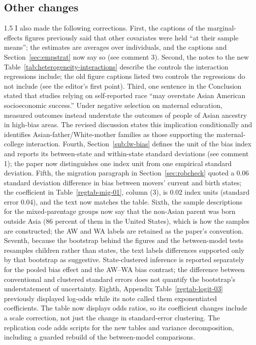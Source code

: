 \documentclass[12pt,english]{article}
\newcommand{\rrxspc}{1.5}
\begin{document}
\begin{refsection}
    \subsection*{Other changes}
    \begin{spacing}{\rrxspc}
        I also made the following corrections. First, the captions of the marginal-effects figures previously said that other covariates were held ``at their sample means''; the estimates are averages over individuals, and the captions and Section~\ref{sec:empstrat} now say so (see comment 3). Second, the notes to the new Table~\ref{tab:heterogeneity-interactions} describe the controls the interaction regressions include; the old figure captions listed two controls the regressions do not include (see the editor's first point). Third, one sentence in the Conclusion stated that studies relying on self-reported race ``may overstate Asian American socioeconomic success.'' Under negative selection on maternal education, measured outcomes instead understate the outcomes of people of Asian ancestry in high-bias areas. The revised discussion states this implication conditionally and identifies Asian-father/White-mother families as those supporting the maternal-college interaction. Fourth, Section~\ref{sub:lw-bias} defines the unit of the bias index and reports its between-state and within-state standard deviations (see comment 1); the paper now distinguishes one index unit from one empirical standard deviation. Fifth, the migration paragraph in Section~\ref{sec:robcheck} quoted a 0.06 standard deviation difference in bias between movers' current and birth states; the coefficient in Table~\ref{regtab-mig-01}, column (3), is 0.02 index units (standard error 0.04), and the text now matches the table. Sixth, the sample descriptions for the mixed-parentage groups now say that the non-Asian parent was born outside Asia (86 percent of them in the United States), which is how the samples are constructed; the AW and WA labels are retained as the paper's convention. Seventh, because the bootstrap behind the figures and the between-model tests resamples children rather than states, the text labels differences supported only by that bootstrap as suggestive. State-clustered inference is reported separately for the pooled bias effect and the AW--WA bias contrast; the difference between conventional and clustered standard errors does not quantify the bootstrap's understatement of uncertainty. Eighth, Appendix Table~\ref{regtab-logit-03} previously displayed log-odds while its note called them exponentiated coefficients. The table now displays odds ratios, so its coefficient changes include a scale correction, not just the change in standard-error clustering. The replication code adds scripts for the new tables and variance decomposition, including a guarded rebuild of the between-model comparisons.


\end{spacing}
\end{refsection}
\end{document}
